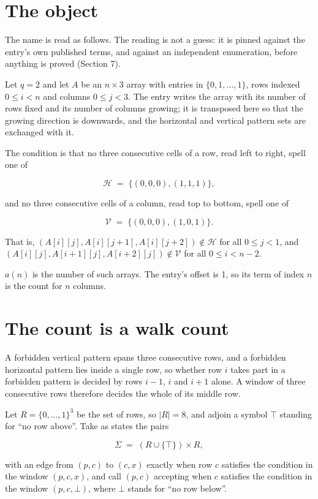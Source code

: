 \documentclass[11pt]{article}
\theoremstyle{definition}
\begin{document}
\section{The object}

The name is read as follows. The reading is not a guess: it is pinned against the entry's own published terms, and against an independent enumeration, before anything is proved (Section 7).

Let $q = 2$ and let $A$ be an $n \times 3$ array with entries in $\{0,1,\dots,1\}$, rows indexed $0 \le i < n$ and columns $0 \le j < 3$. The entry writes the array with its number of rows fixed and its number of columns growing; it is transposed here so that the growing direction is downwards, and the horizontal and vertical pattern sets are exchanged with it.

The condition is that no three consecutive cells of a row, read left to right, spell one of

\[\mathcal{H} \;=\; \{(0,0,0), (1,1,1)\},\]

and no three consecutive cells of a column, read top to bottom, spell one of

\[\mathcal{V} \;=\; \{(0,0,0), (1,0,1)\}.\]

That is, $(A[i][j],A[i][j{+}1],A[i][j{+}2]) \notin \mathcal{H}$ for all $0 \le j < 1$, and $(A[i][j],A[i{+}1][j],A[i{+}2][j]) \notin \mathcal{V}$ for all $0 \le i < n-2$.

$a(n)$ is the number of such arrays. The entry's offset is 1, so its term of index $n$ is the count for $n$ columns.

\section{The count is a walk count}

A forbidden vertical pattern spans three consecutive rows, and a forbidden horizontal pattern lies inside a single row, so whether row $i$ takes part in a forbidden pattern is decided by rows $i-1$, $i$ and $i+1$ alone. A window of three consecutive rows therefore decides the whole of its middle row.

Let $R = \{0,\dots,1\}^{3}$ be the set of rows, so $|R| = 8$, and adjoin a symbol $\top$ standing for ``no row above''. Take as states the pairs

\[\Sigma \;=\; (R \cup \{\top\}) \times R,\]

with an edge from $(p,c)$ to $(c,x)$ exactly when row $c$ satisfies the condition in the window $(p,c,x)$, and call $(p,c)$ accepting when $c$ satisfies the condition in the window $(p,c,\bot)$, where $\bot$ stands for ``no row below''.
\end{document}
